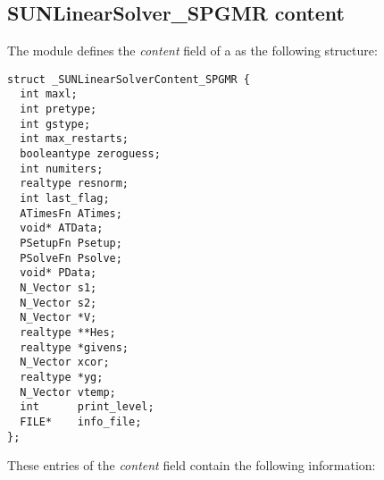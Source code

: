 \subsection{SUNLinearSolver\_SPGMR content}
\label{ss:sunlinsol_spgmr_content}

The {\sunlinsolspgmr} module defines the \textit{content} field of a
 as the following structure:
\begin{verbatim}
struct _SUNLinearSolverContent_SPGMR {
  int maxl;
  int pretype;
  int gstype;
  int max_restarts;
  booleantype zeroguess;
  int numiters;
  realtype resnorm;
  int last_flag;
  ATimesFn ATimes;
  void* ATData;
  PSetupFn Psetup;
  PSolveFn Psolve;
  void* PData;
  N_Vector s1;
  N_Vector s2;
  N_Vector *V;
  realtype **Hes;
  realtype *givens;
  N_Vector xcor;
  realtype *yg;
  N_Vector vtemp;
  int      print_level;
  FILE*    info_file;
};
\end{verbatim}
These entries of the \emph{content} field contain the following
information:
